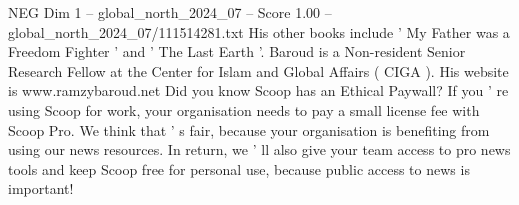 \begin{textsample}{NEG Dim 1 – global\_north\_2024\_07 – Score 1.00 – global\_north\_2024\_07/111514281.txt}
His other books include ' My Father was a Freedom Fighter ' and ' The Last Earth '.
Baroud is a Non-resident Senior Research Fellow at the Center for Islam and Global Affairs ( CIGA ).
His website is www.ramzybaroud.net Did you know Scoop has an Ethical Paywall?
If you ' re using Scoop for work, your organisation needs to pay a small license fee with Scoop Pro.
We think that ' s fair, because your organisation is benefiting from using our news resources.
In return, we ' ll also give your team access to pro news tools and keep Scoop free for personal use, because public access to news is important!

\end{textsample}
